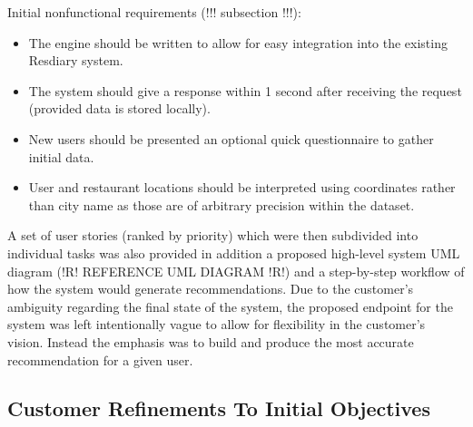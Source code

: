\documentclass{l3proj}
\begin{document}
Initial nonfunctional requirements (!!! subsection !!!):
\begin{itemize}
\item The engine should be written to allow for easy integration into the existing Resdiary system.
\item The system should give a response within 1 second after receiving the request (provided data is stored locally).
\item New users should be presented an optional quick questionnaire to gather initial data.
\item User and restaurant locations should be interpreted using coordinates rather than city  name as those are of arbitrary precision within the dataset.
\end{itemize}

A set of user stories (ranked by priority) which were then subdivided into individual tasks was also provided in addition a proposed high-level system UML diagram (!R! REFERENCE UML DIAGRAM !R!) and a step-by-step workflow of how the system would generate recommendations. Due to the customer’s ambiguity regarding the final state of the system, the proposed endpoint for the system was left intentionally vague to allow for flexibility in the customer’s vision. Instead the emphasis was to build and produce the most accurate recommendation for a given user.


\subsection{Customer Refinements To Initial Objectives}
\label{sec:custrefineinitobj}

\end{document}
